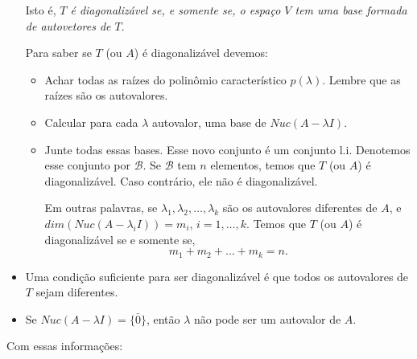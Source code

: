 \documentclass[10pt]{article}
\theoremstyle{plain}
\theoremstyle{obs}
\numberwithin{equation}{section}
\begin{document}
\begin{itemize}
Isto é, {\it $T$ é diagonalizável se, e somente se, o espaço $V$ tem uma base
formada de autovetores de $T$}.

Para saber se $T$ (ou $A$) é diagonalizável devemos:
     \begin{itemize}
     \item Achar todas as raízes do polinômio característico $p(\lambda)$.
     Lembre que as raízes são os autovalores.
     \item Calcular para cada $\lambda$ autovalor, uma base de 
     $Nuc(A-\lambda I)$.
     \item Junte todas essas bases. Esse novo conjunto é um conjunto l.i.
     Denotemos esse conjunto por $\mathcal{B}$. Se $\mathcal{B}$ tem $n$ elementos, temos que $T$ (ou $A$) é 
     diagonalizável. Caso contrário, ele não é diagonalizável.\newline
     
     Em outras palavras, se $\lambda_1, \lambda_2, \dots, \lambda_k$ são os autovalores diferentes de $A$, 
     e $dim (Nuc(A-\lambda_i I))=m_i$, $i=1,\dots, k$. Temos que 
     $T$ (ou $A$) é diagonalizável se e somente se, 
     $$ m_1+m_2+\dots + m_k=n.$$
     \end{itemize}
 \item Uma condição suficiente para ser diagonalizável é que todos os autovalores
  de $T$ sejam diferentes.
  \item Se $Nuc(A-\lambda I)=\{\bar{0}\}$, então $\lambda$ não pode ser um autovalor de $A$.
  \end{itemize}
  
Com essas informações:
  
\end{document}
